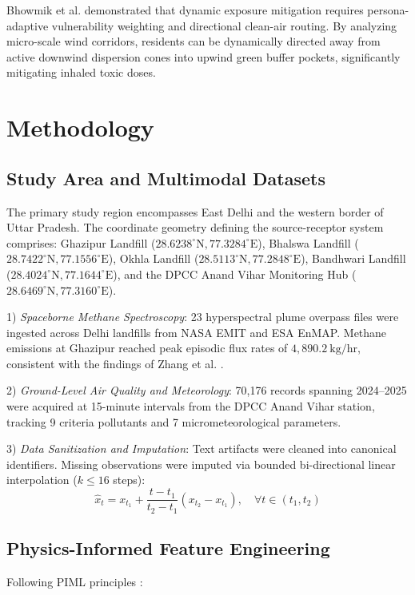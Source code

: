 \documentclass[conference]{IEEEtran}
\begin{document}
Bhowmik et al. \cite{bhowmik2023persona} demonstrated that dynamic exposure mitigation requires persona-adaptive vulnerability weighting and directional clean-air routing. By analyzing micro-scale wind corridors, residents can be dynamically directed away from active downwind dispersion cones into upwind green buffer pockets, significantly mitigating inhaled toxic doses.

\section{Methodology}
\subsection{Study Area and Multimodal Datasets}
The primary study region encompasses East Delhi and the western border of Uttar Pradesh. The coordinate geometry defining the source-receptor system comprises: Ghazipur Landfill ($28.6238^\circ\text{N}, 77.3284^\circ\text{E}$), Bhalswa Landfill ($28.7422^\circ\text{N}, 77.1556^\circ\text{E}$), Okhla Landfill ($28.5113^\circ\text{N}, 77.2848^\circ\text{E}$), Bandhwari Landfill ($28.4024^\circ\text{N}, 77.1644^\circ\text{E}$), and the DPCC Anand Vihar Monitoring Hub ($28.6469^\circ\text{N}, 77.3160^\circ\text{E}$).

1) \textit{Spaceborne Methane Spectroscopy}: 23 hyperspectral plume overpass files were ingested across Delhi landfills from NASA EMIT and ESA EnMAP. Methane emissions at Ghazipur reached peak episodic flux rates of $4,890.2\ \text{kg/hr}$, consistent with the findings of Zhang et al. \cite{zhang2025global}.

2) \textit{Ground-Level Air Quality and Meteorology}: 70,176 records spanning 2024--2025 were acquired at 15-minute intervals from the DPCC Anand Vihar station, tracking 9 criteria pollutants and 7 micrometeorological parameters.

3) \textit{Data Sanitization and Imputation}: Text artifacts were cleaned into canonical identifiers. Missing observations were imputed via bounded bi-directional linear interpolation ($k \le 16$ steps):
\begin{equation}
\hat{x}_t = x_{t_1} + \frac{t - t_1}{t_2 - t_1}(x_{t_2} - x_{t_1}), \quad \forall t \in (t_1, t_2)
\end{equation}

\subsection{Physics-Informed Feature Engineering}
Following PIML principles \cite{karniadakis2021physics, stadler2023physics}:
\end{document}
